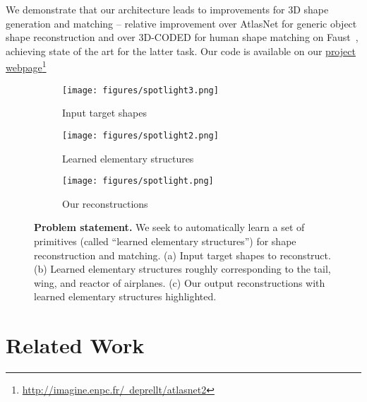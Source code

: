 \documentclass{article}
\begin{document}
We demonstrate that our architecture leads to improvements for 3D shape generation and matching --  relative improvement over AtlasNet for generic object shape reconstruction and  over 3D-CODED for human shape matching on Faust~\cite{bogo2014cvpr}, achieving state of the art for the latter task. Our code is available on our \href{http://imagine.enpc.fr/~deprellt/atlasnet2}{project webpage}\footnote{\href{http://imagine.enpc.fr/~deprellt/atlasnet2}{http://imagine.enpc.fr/~deprellt/atlasnet2}}

\begin{figure}[t]
\centering
\begin{subfigure}[t]{.22\textwidth}
  \centering
  \texttt{[image: figures/spotlight3.png]}
  \caption{Input target shapes}
  \label{fig:splot1}
\end{subfigure}
\begin{subfigure}[t]{.32\textwidth}
  \centering
  \texttt{[image: figures/spotlight2.png]}
  \caption{Learned elementary structures}
  \label{fig:spot2}
\end{subfigure}\begin{subfigure}[t]{.39\textwidth}
  \centering
  \texttt{[image: figures/spotlight.png]}
  \caption{Our reconstructions}
  \label{fig:spot3}
\end{subfigure}
\caption{
{\bf Problem statement.} 
We seek to automatically learn a set of primitives (called ``learned elementary structures'') for shape reconstruction and matching. (a) Input target shapes to reconstruct. (b) Learned elementary structures roughly corresponding to the tail, wing, and reactor of airplanes. (c) Our output reconstructions with learned elementary structures highlighted. 
}
\label{fig:teaser}
\vspace{-1.5em}
\end{figure}





 

\vspace{-1em}
\section{Related Work}
\label{sec:relatedwork}
\end{document}
